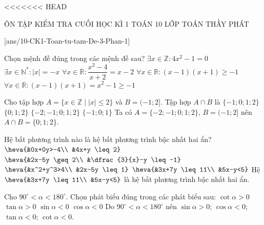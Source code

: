 <<<<<<< HEAD
\begin{name}
	{ÔN TẬP KIỂM TRA CUỐI HỌC KÌ 1}
	{TOÁN 10}
	{LỚP TOÁN THẦY PHÁT}
	{\thoigian}
\end{name}

\caulc
{}[ans/10-CK1-Toan-tu-tam-De-3-Phan-1]

\begin{ex}%
Chọn mệnh đề đúng trong các mệnh đề sau?
\choice
{$\exists x\in \mathbb{Z}:4x^2-1=0$}
{$\exists x\in {{\mathbb{N}}^{*}}:\left| x \right|=-x$}  { $\forall x\in \mathbb{R}:\dfrac{x^2-4}{x+2}=x-2$}
{\True $\forall x\in \mathbb{R}:(x-1 )(x+1 )\ge -1$}
\loigiai
{$\forall x\in \mathbb{R}:(x-1 )(x+1 )=x^2-1\ge -1$}
\end{ex}

\begin{ex}%
Cho tập hợp $A=\{x \in \mathbb{Z} \mid |x| \leq 2\}$ và $B=(-1 ; 2]$. Tập hợp $A \cap B$ là
	\choice
	{$\{-1 ; 0 ; 1 ; 2\}$}
	{\True $\{0 ; 1 ; 2\}$}
	{$\{-2 ;-1 ; 0 ; 1 ; 2\}$}
	{$\{-1 ; 0 ; 1\}$}
	\loigiai
	{
	Ta có $A=\{-2 ;-1 ; 0 ; 1 ; 2\}$, $B=(-1 ; 2]$ nên $A \cap B=\{0 ; 1 ; 2\}$.
	}
\end{ex}
\begin{ex}%
Hệ bất phương trình nào là hệ bất phương trình bậc nhất hai ẩn?
	\choice
	{$\heva{&0x+0y>-4\\ &4x+y \leq 2}$}
	{$\heva{&2x-5y \geq 2\\ &\dfrac{3}{x}-y \leq-1}$}
	{$\heva{&x^2+y^3>4\\ &2x-5y \leq 1}$}
	{\True $\heva{&3x+7y \leq 11\\ &5x-y<5}$}
	\loigiai
	{
	Hệ $\heva{&3x+7y \leq 11\\ &5x-y<5}$ là hệ bất phương trình bậc nhất hai ẩn.
	}
\end{ex}

\begin{ex}%
Cho $90^{\circ}<\alpha<180^{\circ}$. Chọn phát biểu đúng trong các phát biểu sau:
	\choice
	{$\cot \alpha>0$}
	{$\tan \alpha>0$}
	{$\sin \alpha<0$}
	{\True $\cos \alpha<0$}
	\loigiai
	{
	Do $90^{\circ}<\alpha<180^{\circ}$ nên $\sin \alpha>0$; $\cos \alpha<0$; $\tan \alpha<0$; $\cot \alpha<0$.
	}
\end{ex}

